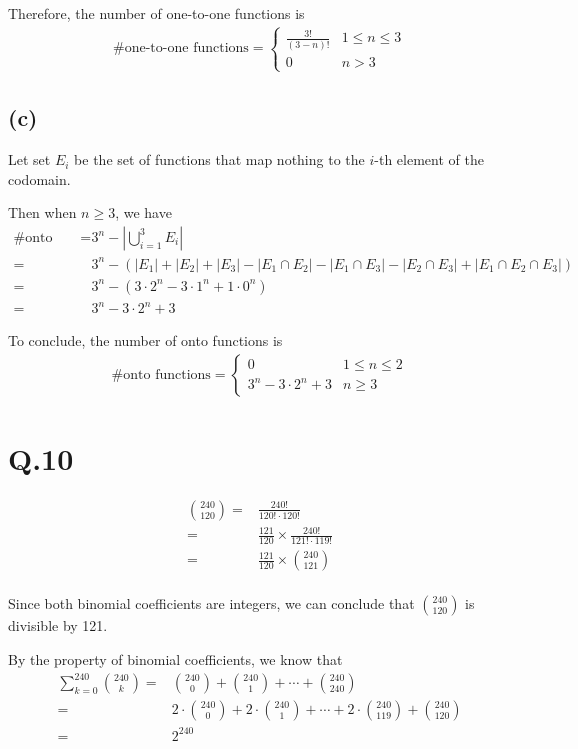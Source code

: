 \documentclass[a4paper,12pt]{article}
\begin{document}
Therefore, the number of one-to-one functions is
\begin{align*}
	\text{\#one-to-one functions} =
	\begin{cases}
		\frac{3!}{(3 - n)!} & 1 \leq n \leq 3 \\
		0 & n > 3
	\end{cases}
\end{align*}

\subsection*{(c)}

Let set $E_i$ be the set of functions that map nothing to the $i$-th element of the codomain.

Then when $n \geq 3$, we have
\begin{align*}
	\text{\#onto functions} =& 3^n - \left|\bigcup_{i = 1}^{3} E_i\right| \\
	=& 3^n - (|E_1| + |E_2| + |E_3| - |E_1 \cap E_2| - |E_1 \cap E_3| - |E_2 \cap E_3| + |E_1 \cap E_2 \cap E_3|) \\ 
	=& 3^n - (3 \cdot 2^n - 3 \cdot 1^n + 1 \cdot 0^n) \\
	=& 3^n - 3 \cdot 2^n + 3
\end{align*}

To conclude, the number of onto functions is
\begin{align*}
	\text{\#onto functions} =
	\begin{cases}
		0 & 1 \leq n \leq 2 \\
		3^n - 3 \cdot 2^n + 3 & n \geq 3 
	\end{cases}
\end{align*}

\section*{Q.10}

\begin{align*}
	\binom{240}{120} =& \frac{240!}{120! \cdot 120!} \\
	=& \frac{121}{120} \times \frac{240!}{121! \cdot 119!} \\
	=& \frac{121}{120} \times \binom{240}{121} \\
\end{align*}

Since both binomial coefficients are integers, we can conclude that $\binom{240}{120}$ is divisible by 121.

By the property of binomial coefficients, we know that
\begin{align*}
	\sum_{k = 0}^{240} \binom{240}{k} =& \binom{240}{0} + \binom{240}{1} + \cdots + \binom{240}{240} \\
	=& 2 \cdot \binom{240}{0} + 2 \cdot \binom{240}{1} + \cdots + 2 \cdot \binom{240}{119} + \binom{240}{120} \\
	=& 2^{240}
\end{align*}
\end{document}
